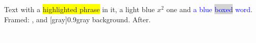 \documentclass{article}
\begin{document}
Text with a \colorbox{yellow}{highlighted phrase} in it, \colorbox[rgb]{0.8,0.9,1}{a light blue $x^2$ one} and
\textcolor{blue}{a blue \colorbox{lightgray}{boxed} word}. Framed: ,
 and [gray]{0.9}{gray background}. After.

\noindent\colorbox{masthead}{\parbox{\dimexpr\textwidth-2\fboxsep}{{\large\textcolor{white}{A masthead in white}}}}
\end{document}
